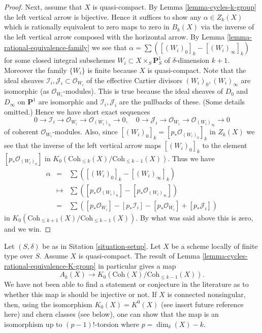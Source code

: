 \begin{proof}
\medskip\noindent
Next, assume that $X$ is quasi-compact. By Lemma \ref{lemma-cycles-k-group}
the left vertical arrow is bijective. Hence it suffices to show
any $\alpha \in Z_k(X)$ which is rationally equivalent to zero
maps to zero in $B_k(X)$ via the inverse of the left vertical
arrow composed with the horizontal arrow.
By Lemma \ref{lemma-rational-equivalence-family} we see that
$\alpha = \sum ([(W_i)_0]_k - [(W_i)_\infty]_k)$ for some
closed integral subschemes $W_i \subset X\times_S \mathbf{P}^1_S$
of $\delta$-dimension $k + 1$. Moreover the family
$\{W_i\}$ is finite because $X$ is quasi-compact.
Note that the ideal sheaves
$\mathcal{I}_i, \mathcal{J}_i \subset \mathcal{O}_{W_i}$
of the effective Cartier divisors $(W_i)_0, (W_i)_\infty$
are isomorphic (as $\mathcal{O}_{W_i}$-modules). This is true
because the ideal sheaves of $D_0$ and $D_\infty$ on $\mathbf{P}^1$
are isomorphic and $\mathcal{I}_i, \mathcal{J}_i$ are the pullbacks of
these. (Some details omitted.) Hence we have
short exact sequences
$$
0 \to \mathcal{I}_i \to \mathcal{O}_{W_i} \to \mathcal{O}_{(W_i)_0} \to 0,
\quad
0 \to \mathcal{J}_i \to \mathcal{O}_{W_i} \to \mathcal{O}_{(W_i)_\infty} \to 0
$$
of coherent $\mathcal{O}_{W_i}$-modules.
Also, since $[(W_i)_0]_k = [p_*\mathcal{O}_{(W_i)_0}]_k$ in
$Z_k(X)$ we see that the inverse of the left vertical arrow
maps $[(W_i)_0]_k$ to the element $[p_*\mathcal{O}_{(W_i)_0}]$ in
$K_0(\text{Coh}_{\leq k}(X)/\text{Coh}_{\leq k - 1}(X))$.
Thus we have
\begin{eqnarray*}
\alpha
& = &
\sum \left([(W_i)_0]_k - [(W_i)_\infty]_k\right) \\
& \mapsto &
\sum \left([p_*\mathcal{O}_{(W_i)_0}] - [p_*\mathcal{O}_{(W_i)_\infty}]\right)
\\
& = &
\sum \left([p_*\mathcal{O}_{W_i}] - [p_*\mathcal{I}_i]
- [p_*\mathcal{O}_{W_i}] + [p_*\mathcal{J}_i]\right)
\end{eqnarray*}
in $K_0(\text{Coh}_{\leq k + 1}(X)/\text{Coh}_{\leq k - 1}(X))$.
By what was said above this is zero, and we win.
\end{proof}

\begin{remark}
\label{remark-good-cases-K-A}
Let $(S, \delta)$ be as in Sitation \ref{situation-setup}.
Let $X$ be a scheme locally of finite type over $S$.
Assume $X$ is quasi-compact.
The result of Lemma \ref{lemma-cycles-rational-equivalence-K-group}
in particular gives a map
$$
A_k(X)
\longrightarrow
K_0(\text{Coh}(X)/\text{Coh}_{\leq k - 1}(X)).
$$
We have not been able to find a statement or conjecture in the
literature as to whether this map is should be injective or not.
If $X$ is connected nonsingular, then, using the
isomorphism $K_0(X) = K^0(X)$ (see insert future reference here)
and chern classes (see below), one can show that
the map is an isomorphism up to $(p - 1)!$-torsion where
$p = \dim_\delta(X) - k$.
\end{remark}


















